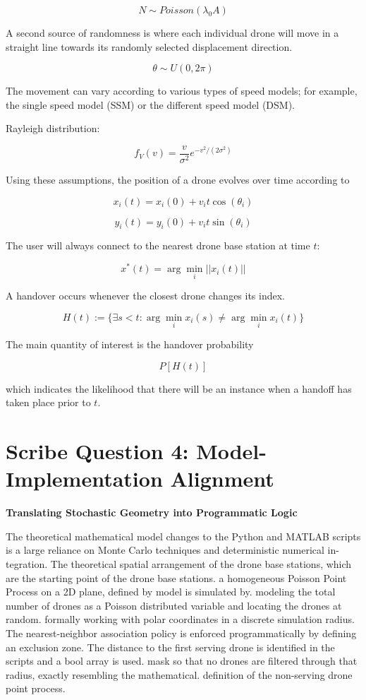 \documentclass[12pt,a4paper]{article}
\begin{document}
\[
N \sim Poisson(\lambda_0 A)
\]

A second source of randomness is where each individual drone will move in a straight line towards its randomly selected displacement direction.

\[
\theta \sim U(0,2\pi)
\]

The movement can vary according to various types of speed models; for example, the single speed model (SSM) or the different speed model (DSM).

Rayleigh distribution:

\[
f_V(v) = \frac{v}{\sigma^2} e^{-v^2/(2\sigma^2)}
\]

Using these assumptions, the position of a drone evolves over time according to

\[
x_i(t) = x_i(0) + v_i t \cos(\theta_i)
\]

\[
y_i(t) = y_i(0) + v_i t \sin(\theta_i)
\]

The user will always connect to the nearest drone base station at time $t$:

\[
x^*(t) = \arg \min_i ||x_i(t)||
\]

A handover occurs whenever the closest drone changes its index.

\[
H(t) := \{\exists s < t : \arg\min_i x_i(s) \neq \arg\min_i x_i(t)\}
\]

The main quantity of interest is the handover probability

\[
P[H(t)]
\]

which indicates the likelihood that there will be an instance when a handoff has taken place prior to $t$.

\newpage


\section*{Scribe Question 4: Model-Implementation Alignment}

\textbf{Translating Stochastic Geometry into Programmatic Logic}

The theoretical mathematical model changes to the Python and MATLAB scripts is a large reliance on Monte Carlo techniques and deterministic numerical in- tegration. The theoretical spatial arrangement of the drone base stations, which are the starting point of the drone base stations. a homogeneous Poisson Point Process on a 2D plane, defined by model is simulated by. modeling the total number of drones as a Poisson distributed variable and locating the drones at random. formally working with polar coordinates in a discrete simulation radius. The nearest-neighbor association policy is enforced programmatically by defining an exclusion zone. The distance to the first serving drone is identified in the scripts and a bool array is used. mask so that no drones are filtered through that radius, exactly resembling the mathematical. definition of the non-serving drone point process. 
\end{document}
